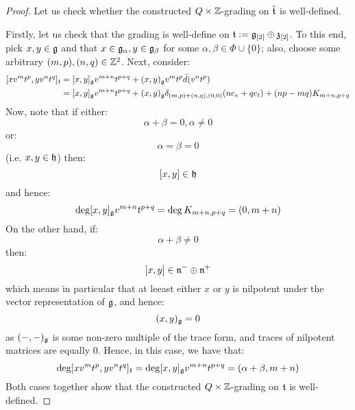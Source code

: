             \begin{proof}
                Let us check whether the constructed $Q \x \Z$-grading on $\hat{\mathfrak{t}}$ is well-defined.
    
                Firstly, let us check that the grading is well-define on $\mathfrak{t} := \mathfrak{g}_{[2]} \oplus \mathfrak{z}_{[2]}$. To this end, pick $x, y \in \mathfrak{g}$ and that $x \in \mathfrak{g}_{\alpha}, y \in \mathfrak{g}_{\beta}$ for some $\alpha, \beta \in \Phi \cup \{0\}$; also, choose some arbitrary $(m, p), (n, q) \in \mathbb{Z}^2$. Next, consider:
                    $$
                        \begin{aligned}
                            [x v^m t^p, y v^n t^q]_{\toroidal} & = [x, y]_{\g} v^{m + n} t^{p + q} + (x, y)_{\g} v^m t^p \bar{d}(v^n t^p)
                            \\
                            & = [x, y]_{\g} v^{m + n} t^{p + q} + (x, y)_{\g} \delta_{(m, p) + (n, q), (0, 0)} ( n c_v + q c_t ) + (np - mq) K_{m + n, p + q}
                        \end{aligned}
                    $$
                Now, note that if either:
                    $$\alpha + \beta = 0, \alpha \not = 0$$
                or:
                    $$\alpha = \beta = 0$$
                (i.e. $x, y \in \mathfrak{h}$) then:
                    $$[x, y] \in \mathfrak{h}$$
                and hence:
                    $$\deg [x, y]_{\mathfrak{g}} v^{m + n} t^{p + q} = \deg K_{m + n, p + q} = (0, m + n)$$
                On the other hand, if:
                    $$\alpha + \beta \not = 0$$
                then:
                    $$[x, y] \in \mathfrak{n}^- \oplus \mathfrak{n}^+$$
                which means in particular that at leeast either $x$ or $y$ is nilpotent under the vector representation of $\mathfrak{g}$, and hence:
                    $$(x, y)_{\mathfrak{g}} = 0$$
                as $(-, -)_{\mathfrak{g}}$ is some non-zero multiple of the trace form, and traces of nilpotent matrices are equally $0$. Hence, in this case, we have that:
                    $$\deg [x v^m t^p, y v^n t^q]_{\mathfrak{t}} = \deg [x, y]_{\mathfrak{g}} v^{m + n} t^{p + q} = (\alpha + \beta, m + n)$$
                Both cases together show that the constructed $Q \x \Z$-grading on $\mathfrak{t}$ is well-defined. 
                

\end{proof}
